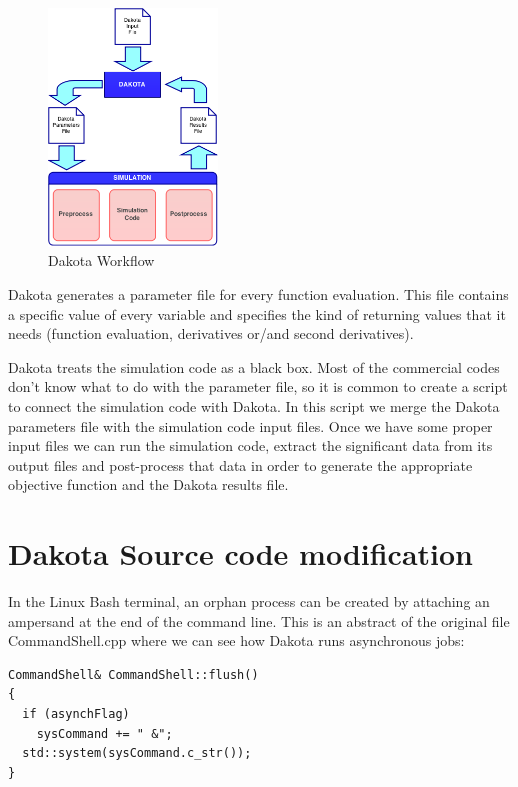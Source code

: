 \documentclass[12pt,a4paper,article]{memoir} %
\begin{document}
\begin{figure}[htb!]
  \centering
    \includegraphics[width=0.4\textwidth]{DakotaWorkflow}
  \caption{Dakota Workflow}
  \label{fig:Workflow}
\end{figure}

Dakota generates a parameter file for every function evaluation. This file contains a specific value of every variable and specifies the kind of returning values that it needs (function evaluation, derivatives or/and second derivatives).

Dakota treats the simulation code as a black box. Most of the commercial codes don't know what to do with the parameter file, so it is common to create a script to connect the simulation code with Dakota. In this script we merge the Dakota parameters file with the simulation code input files. Once we have some proper input files we can run the simulation code, extract the significant data from its output files and post-process that data in order to generate the appropriate objective function and the Dakota results file.

\appendix

\chapter{Dakota Source code modification}
\label{chapter:CodeMod}
In the Linux Bash terminal, an orphan process can be created by attaching an ampersand at the end of the command line. This is an abstract of the original file CommandShell.cpp where we can see how Dakota runs asynchronous jobs:

\begin{lstlisting}[frame=single]
CommandShell& CommandShell::flush()
{
  if (asynchFlag)
    sysCommand += " &";
  std::system(sysCommand.c_str());
}
\end{lstlisting}
\end{document}
